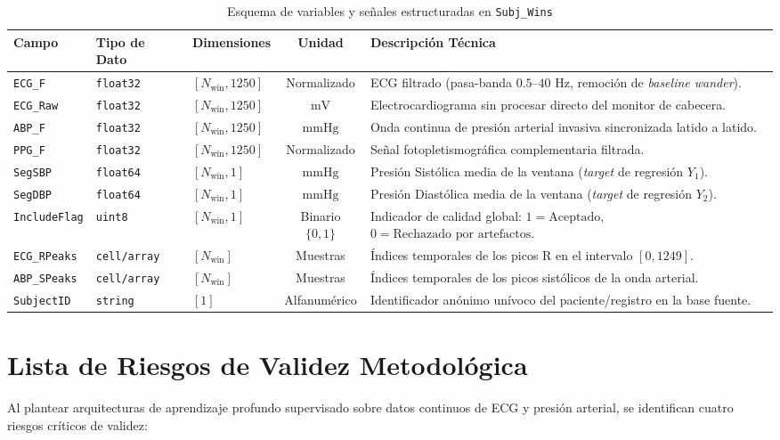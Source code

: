 \documentclass[journal,10pt]{IEEEtran}
\begin{document}
\begin{table}[htbp]
\caption{Esquema de variables y señales estructuradas en \texttt{Subj\_Wins}}
\label{tab:diccionario}
\centering
\begin{tabular}{lllcl}
\toprule
\textbf{Campo} & \textbf{Tipo de Dato} & \textbf{Dimensiones} & \textbf{Unidad} & \textbf{Descripción Técnica} \\
\midrule
\texttt{ECG\_F} & \texttt{float32} & $[N_{\text{win}}, 1250]$ & Normalizado & ECG filtrado (pasa-banda $0.5\text{--}40\text{ Hz}$, remoción de \textit{baseline wander}). \\
\texttt{ECG\_Raw} & \texttt{float32} & $[N_{\text{win}}, 1250]$ & $\text{mV}$ & Electrocardiograma sin procesar directo del monitor de cabecera. \\
\texttt{ABP\_F} & \texttt{float32} & $[N_{\text{win}}, 1250]$ & $\text{mmHg}$ & Onda continua de presión arterial invasiva sincronizada latido a latido. \\
\texttt{PPG\_F} & \texttt{float32} & $[N_{\text{win}}, 1250]$ & Normalizado & Señal fotopletismográfica complementaria filtrada. \\
\texttt{SegSBP} & \texttt{float64} & $[N_{\text{win}}, 1]$ & $\text{mmHg}$ & Presión Sistólica media de la ventana (\textit{target} de regresión $Y_1$). \\
\texttt{SegDBP} & \texttt{float64} & $[N_{\text{win}}, 1]$ & $\text{mmHg}$ & Presión Diastólica media de la ventana (\textit{target} de regresión $Y_2$). \\
\texttt{IncludeFlag} & \texttt{uint8} & $[N_{\text{win}}, 1]$ & Binario $\{0,1\}$ & Indicador de calidad global: $1 = \text{Aceptado}$, $0 = \text{Rechazado por artefactos}$. \\
\texttt{ECG\_RPeaks} & \texttt{cell/array} & $[N_{\text{win}}]$ & Muestras & Índices temporales de los picos R en el intervalo $[0, 1249]$. \\
\texttt{ABP\_SPeaks} & \texttt{cell/array} & $[N_{\text{win}}]$ & Muestras & Índices temporales de los picos sistólicos de la onda arterial. \\
\texttt{SubjectID} & \texttt{string} & $[1]$ & Alfanumérico & Identificador anónimo unívoco del paciente/registro en la base fuente. \\
\bottomrule
\end{tabular}
\end{table}

\section{Lista de Riesgos de Validez Metodológica}
Al plantear arquitecturas de aprendizaje profundo supervisado sobre datos continuos de ECG y presión arterial, se identifican cuatro riesgos críticos de validez:
\end{document}
